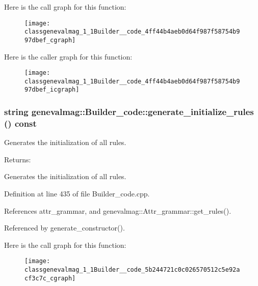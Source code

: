 Here is the call graph for this function:\nopagebreak
\begin{figure}[H]
\begin{center}
\leavevmode
\texttt{[image: classgenevalmag\_1\_1Builder\_\_code\_4ff44b4aeb0d64f987f58754b997dbef\_cgraph]}
\end{center}
\end{figure}


Here is the caller graph for this function:\nopagebreak
\begin{figure}[H]
\begin{center}
\leavevmode
\texttt{[image: classgenevalmag\_1\_1Builder\_\_code\_4ff44b4aeb0d64f987f58754b997dbef\_icgraph]}
\end{center}
\end{figure}
\hypertarget{classgenevalmag_1_1Builder__code_5b244721c0c026570512c5e92acf3c7c}{
\subsubsection[{generate\_\-initialize\_\-rules}]{\setlength{\rightskip}{0pt plus 5cm}string genevalmag::Builder\_\-code::generate\_\-initialize\_\-rules () const}}
\label{classgenevalmag_1_1Builder__code_5b244721c0c026570512c5e92acf3c7c}


Generates the initialization of all rules. \begin{Desc}
\item[Returns:]\end{Desc}
Generates the initialization of all rules. 

Definition at line 435 of file Builder\_\-code.cpp.

References attr\_\-grammar, and genevalmag::Attr\_\-grammar::get\_\-rules().

Referenced by generate\_\-constructor().

Here is the call graph for this function:\nopagebreak
\begin{figure}[H]
\begin{center}
\leavevmode
\texttt{[image: classgenevalmag\_1\_1Builder\_\_code\_5b244721c0c026570512c5e92acf3c7c\_cgraph]}
\end{center}
\end{figure}


